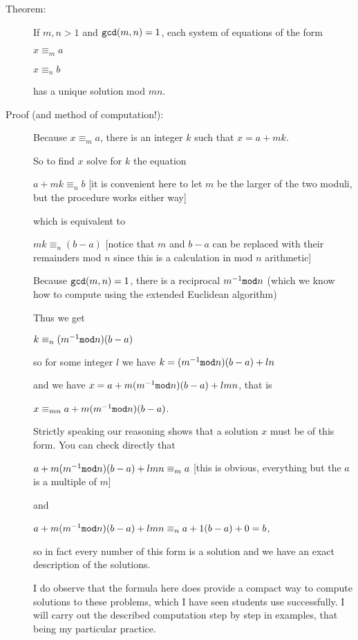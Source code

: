 \documentclass[12pt]{article}
\begin{document}
\begin{description}

\item[Theorem:]  If $m,n >1$ and ${\tt gcd}(m,n)=1$, each system of equations of the form

$x\equiv_m a$

$x \equiv_n b$

has a unique solution mod $mn$.

\item[Proof (and method of computation!):]  Because $x \equiv_m a$, there is an integer $k$ such that
$x = a+mk$.

So to find $x$ solve for $k$ the equation 

 $a+mk \equiv_n b$  [it is convenient here to let $m$ be the larger of the two moduli, but the procedure works either way]

which is equivalent to

$mk \equiv_n (b-a)$  [notice that $m$ and $b-a$ can be replaced with their remainders mod $n$ since this is a calculation in mod $n$ arithmetic]

Because ${\tt gcd}(m,n)=1$, there is a reciprocal $m^{-1} {\tt mod} n$ (which we know how to compute using the extended Euclidean algorithm)

Thus we get

$k \equiv_n (m^{-1} {\tt mod} n)(b-a)$

so for some integer $l$ we have $k=(m^{-1} {\tt mod} n)(b-a) + ln$

and we have $x = a + m(m^{-1} {\tt mod} n)(b-a) + lmn$, that is

$x \equiv_{mn} a + m(m^{-1} {\tt mod} n)(b-a)$.

Strictly speaking our reasoning shows that a solution $x$ must be of this form.  You can check directly that

$a + m(m^{-1} {\tt mod} n)(b-a) + lmn \equiv_m a$ [this is obvious, everything but the $a$ is a multiple of $m$]

and

$a +m(m^{-1}{\tt mod} n)(b-a) + lmn \equiv_n a + 1(b-a) + 0 = b$,

so in fact every number of this form is a solution and we have an exact description of the solutions.

I do observe that the formula here does provide a compact way to compute solutions to these problems, which I have seen students use successfully.  I will carry out the described computation step by step in examples, that being my particular practice.


\end{description}
\end{document}
